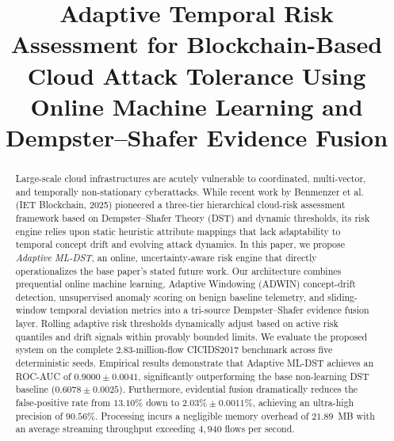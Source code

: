 \documentclass[conference]{IEEEtran}
\begin{document}
\title{Adaptive Temporal Risk Assessment for Blockchain-Based Cloud Attack Tolerance Using Online Machine Learning and Dempster--Shafer Evidence Fusion}

\author{\IEEEauthorblockN{\textbf{\textcolor{red}{PRELIMINARY DRAFT — RESULTS INVALIDATED PENDING CORRECTED IMPLEMENTATION AND TEMPORAL EVALUATION.}}}
}

\maketitle

\begin{abstract}
Large-scale cloud infrastructures are acutely vulnerable to coordinated, multi-vector, and temporally non-stationary cyberattacks. While recent work by Benmenzer et al. (IET Blockchain, 2025) pioneered a three-tier hierarchical cloud-risk assessment framework based on Dempster--Shafer Theory (DST) and dynamic thresholds, its risk engine relies upon static heuristic attribute mappings that lack adaptability to temporal concept drift and evolving attack dynamics. In this paper, we propose \textit{Adaptive ML-DST}, an online, uncertainty-aware risk engine that directly operationalizes the base paper's stated future work. Our architecture combines prequential online machine learning, Adaptive Windowing (ADWIN) concept-drift detection, unsupervised anomaly scoring on benign baseline telemetry, and sliding-window temporal deviation metrics into a tri-source Dempster--Shafer evidence fusion layer. Rolling adaptive risk thresholds dynamically adjust based on active risk quantiles and drift signals within provably bounded limits. We evaluate the proposed system on the complete 2.83-million-flow CICIDS2017 benchmark across five deterministic seeds. Empirical results demonstrate that Adaptive ML-DST achieves an ROC-AUC of $0.9000 \pm 0.0041$, significantly outperforming the base non-learning DST baseline ($0.6078 \pm 0.0025$). Furthermore, evidential fusion dramatically reduces the false-positive rate from $13.10\%$ down to $2.03\% \pm 0.0011\%$, achieving an ultra-high precision of $90.56\%$. Processing incurs a negligible memory overhead of $21.89$~MB with an average streaming throughput exceeding $4,940$ flows per second.
\end{abstract}
\end{document}
